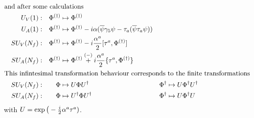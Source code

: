 \begin{subequations}
\begin{align}
        \intertext{and after some calculations}
         &  & U_V(1): &  & \Phi^{(\dagger)} & \mapsto \Phi^{(\dagger)}                                                              \\
         &  & U_A(1): &  & \Phi^{(\dagger)} & \mapsto \Phi^{(\dagger)}-{i}\alpha(\overline{\psi}\gamma_5\psi-\tau_a(\overline{\psi}\tau_a\psi)) &        &                                  \\
         &  & SU_V(N_f): &  & \Phi^{(\dagger)} & \mapsto \Phi^{(\dagger)}-{i}\frac{\alpha^a}{2}[\tau^a,\Phi^{(\dagger)}]                                                              \\
         &  & SU_A(N_f): &  & \Phi^{(\dagger)} & \mapsto \Phi^{(\dagger)}\overset{(-)}{+}{i}\frac{\alpha^a}{2}\{\tau^a,\Phi^{(\dagger)}\} &        &                                  \\
        \intertext{This infintesimal transformation behaviour corresponds to the finite transformations}
         &  & SU_V(N_f): &  & \Phi & \mapsto U\Phi U^\dagger                                                          &        \Phi^{\dagger} & \mapsto U\Phi^{\dagger}U^\dagger                                  \\
         &  & SU_A(N_f): &  & \Phi             & \mapsto U^\dagger\Phi U^\dagger&\Phi^\dagger&\mapsto U\Phi^\dagger U                 &                                              
    \end{align}
\end{subequations}
with $U=\exp\big(-\frac{{i}}{2}\alpha^a\tau^a)$.


